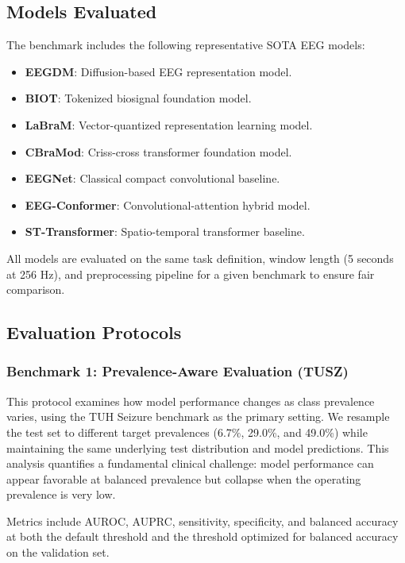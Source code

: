 \documentclass[journal]{IEEEtran}
\begin{document}
\subsection{Models Evaluated}

The benchmark includes the following representative SOTA EEG models:

\begin{itemize}
  \item \textbf{EEGDM}: Diffusion-based EEG representation model.
  \item \textbf{BIOT}: Tokenized biosignal foundation model.
  \item \textbf{LaBraM}: Vector-quantized representation learning model.
  \item \textbf{CBraMod}: Criss-cross transformer foundation model.
  \item \textbf{EEGNet}: Classical compact convolutional baseline.
  \item \textbf{EEG-Conformer}: Convolutional-attention hybrid model.
  \item \textbf{ST-Transformer}: Spatio-temporal transformer baseline.
\end{itemize}

All models are evaluated on the same task definition, window length (5 seconds at 256 Hz), and preprocessing pipeline for a given benchmark to ensure fair comparison.

\subsection{Evaluation Protocols}

\subsubsection{Benchmark 1: Prevalence-Aware Evaluation (TUSZ)}

This protocol examines how model performance changes as class prevalence varies, using the TUH Seizure benchmark as the primary setting. We resample the test set to different target prevalences (6.7\%, 29.0\%, and 49.0\%) while maintaining the same underlying test distribution and model predictions. This analysis quantifies a fundamental clinical challenge: model performance can appear favorable at balanced prevalence but collapse when the operating prevalence is very low.

Metrics include AUROC, AUPRC, sensitivity, specificity, and balanced accuracy at both the default threshold and the threshold optimized for balanced accuracy on the validation set.
\end{document}
